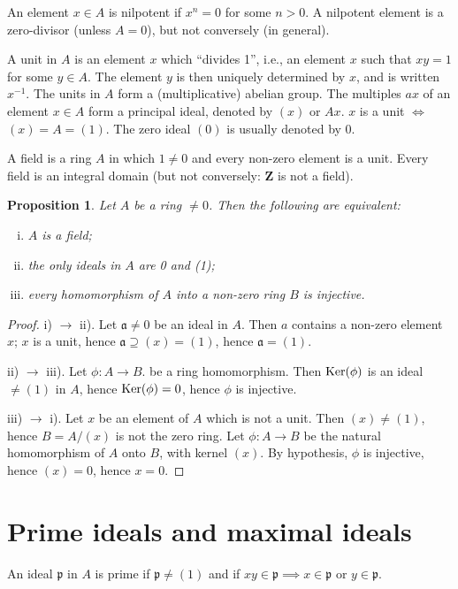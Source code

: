 \documentclass[class=book, crop=false]{standalone}
\newtheorem{proposition}[theorem]{Proposition}
\theoremstyle{definition}
\theoremstyle{remark}
\begin{document}
An element $x \in A$ is nilpotent if $x^{n}=0$ for some $n>0$. A nilpotent
element is a zero-divisor (unless $A=0$), but not conversely (in general).

A unit in $A$ is an element $x$ which ``divides 1'', i.e., an element $x$ such
that $x y=1$ for some $y \in A$. The element $y$ is then uniquely determined by
$x$, and is written $x^{-1}$. The units in $A$ form a (multiplicative) abelian
group. The multiples $a x$ of an element $x \in A$ form a principal ideal,
denoted by $(x)$ or $A x$. $x$ is a unit $\iff$ $(x)=A=(1)$. The zero ideal
$(0)$ is usually denoted by $0$.

A field is a ring $A$ in which $1 \neq 0$ and every non-zero element is a unit.
Every field is an integral domain (but not conversely: $\mathbf{Z}$ is not a
field).

\begin{proposition}\label{prop:1.2}
  Let $A$ be a ring $\neq 0$. Then the following are equivalent:
  \begin{enumerate}[i)]
    \item $A$ is a field;
    \item the only ideals in $A$ are 0 and (1);
    \item every homomorphism of $A$ into a non-zero ring $B$ is injective.
  \end{enumerate}
\end{proposition}
\begin{proof}
  i) $\to$ ii). Let $\mathfrak{a} \neq 0$ be an ideal in $A$. Then $a$ contains
  a non-zero element $x$; $x$ is a unit, hence $\mathfrak{a} \supseteq(x)=(1)$,
  hence $\mathfrak{a}=(1)$.

  ii) $\to$ iii). Let $\phi: A \to B$. be a ring homomorphism. Then
  $\operatorname{Ker}(\phi)$ is an ideal $\neq(1)$ in $A$, hence
  $\operatorname{Ker}(\phi)=0$, hence $\phi$ is injective.

  iii) $\to$ i). Let $x$ be an element of $A$ which is not a unit. Then
  $(x) \neq(1)$, hence $B=A /(x)$ is not the zero ring. Let $\phi: A \to B$ be
  the natural homomorphism of $A$ onto $B$, with kernel $(x)$. By hypothesis,
  $\phi$ is injective, hence $(x)=0$, hence $x=0$.
\end{proof}
\section{Prime ideals and maximal ideals}
An ideal $\mathfrak{p}$ in $A$ is prime if $\mathfrak{p} \neq(1)$ and if
$x y \in \mathfrak{p} \implies x \in \mathfrak{p}$ or $y \in \mathfrak{p}$.
\end{document}

